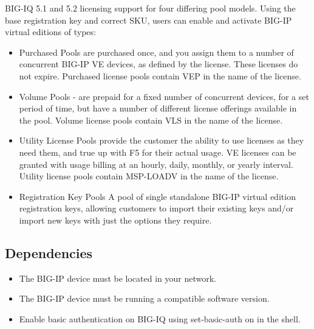 \documentclass[letterpaper,10pt,english]{sphinxmanual}
\begin{document}

BIG-IQ 5.1 and 5.2 licensing support for four differing pool models.
Using the base registration key and correct SKU, users can enable and
activate BIG-IP virtual editions of types:
\begin{itemize}
\item {} 
Purchased Pools \textendash{} are purchased once, and you assign them to a number
of concurrent BIG-IP VE devices, as defined by the license. These
licenses do not expire. Purchased license pools contain VEP in the
name of the license.

\item {} 
Volume Pools - are prepaid for a fixed number of concurrent devices,
for a set period of time, but have a number of different license
offerings available in the pool. Volume license pools contain VLS in
the name of the license.

\item {} 
Utility License Pools \textendash{} provide the customer the ability to use
licenses as they need them, and true up with F5 for their actual
usage. VE licenses can be granted with usage billing at an hourly,
daily, monthly, or yearly interval. Utility license pools contain
MSP-LOADV in the name of the license.

\item {} 
Registration Key Pools \textendash{} A pool of single standalone BIG-IP virtual
edition registration keys, allowing customers to import their
existing keys and/or import new keys with just the options they
require.

\end{itemize}


\subsection{Dependencies}
\label{\detokenize{class1/module4/lab2:dependencies}}\label{\detokenize{class1/module4/lab2::doc}}\begin{itemize}
\item {} 
The BIG-IP device must be located in your network.

\item {} 
The BIG-IP device must be running a compatible software version.

\item {} 
Enable basic authentication on BIG-IQ using set-basic-auth on in the
shell.

\end{itemize}
\end{document}
